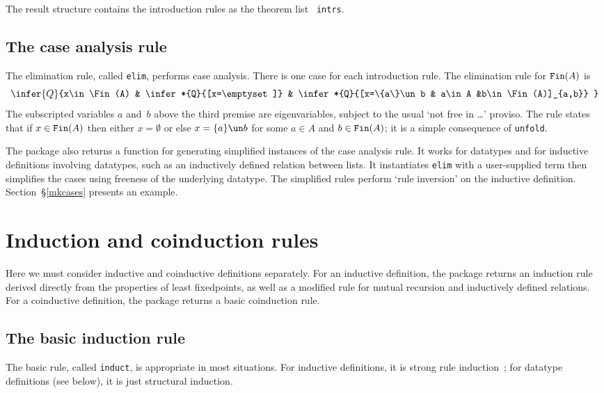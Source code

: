 The result structure contains the introduction rules as the theorem list {\tt
intrs}.

\subsection{The case analysis rule}
The elimination rule, called {\tt elim}, performs case analysis.  There is one
case for each introduction rule.  The elimination rule
for $\hbox{\tt Fin}(A)$ is
\[ \infer{Q}{x\in\Fin(A) & \infer*{Q}{[x=\emptyset]}
                 & \infer*{Q}{[x=\{a\}\un b & a\in A &b\in\Fin(A)]_{a,b}} }
\]
The subscripted variables $a$ and~$b$ above the third premise are
eigenvariables, subject to the usual `not free in \ldots' proviso.
The rule states that if $x\in\hbox{\tt Fin}(A)$ then either $x=\emptyset$ or else
$x=\{a\}\un b$ for some $a\in A$ and $b\in\hbox{\tt Fin}(A)$; it is a simple consequence
of {\tt unfold}.

The package also returns a function for generating simplified instances of
the case analysis rule.  It works for datatypes and for inductive
definitions involving datatypes, such as an inductively defined relation
between lists.  It instantiates {\tt elim} with a user-supplied term then
simplifies the cases using freeness of the underlying datatype.  The
simplified rules perform `rule inversion' on the inductive definition.
Section~\S\ref{mkcases} presents an example.


\section{Induction and coinduction rules}
Here we must consider inductive and coinductive definitions separately.
For an inductive definition, the package returns an induction rule derived
directly from the properties of least fixedpoints, as well as a modified
rule for mutual recursion and inductively defined relations.  For a
coinductive definition, the package returns a basic coinduction rule.

\subsection{The basic induction rule}\label{basic-ind-sec}
The basic rule, called {\tt induct}, is appropriate in most situations.
For inductive definitions, it is strong rule induction~\cite{camilleri92}; for
datatype definitions (see below), it is just structural induction.  

